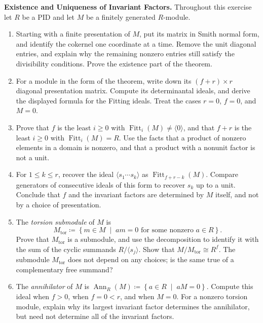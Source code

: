 \documentclass[12pt,reqno]{amsart}
\DeclareMathOperator{\Fitt}{Fitt}
\DeclareMathOperator{\Ann}{Ann}
\begin{document}
\begin{problems}
\item\label{s:structure} \textbf{Existence and Uniqueness of Invariant Factors.} Throughout this exercise let $R$ be a PID and let $M$ be a finitely generated $R$-module.
\begin{enumerate}
\item Starting with a finite presentation of $M$, put its matrix in Smith normal form, and identify the cokernel one coordinate at a time. Remove the unit diagonal entries, and explain why the remaining nonzero entries still satisfy the divisibility conditions. Prove the existence part of the theorem.
\item For a module in the form of the theorem, write down its $(f+r)\times r$ diagonal presentation matrix. Compute its determinantal ideals, and derive the displayed formula for the Fitting ideals. Treat the cases $r=0$, $f=0$, and $M=0$.
\item Prove that $f$ is the least $i\geq0$ with $\Fitt_i(M)\ne\langle0\rangle$, and that $f+r$ is the least $i\geq0$ with $\Fitt_i(M)=R$. Use the facts that a product of nonzero elements in a domain is nonzero, and that a product with a nonunit factor is not a unit.
\item For $1\leq k\leq r$, recover the ideal $\langle s_1\cdots s_k\rangle$ as $\Fitt_{f+r-k}(M)$. Compare generators of consecutive ideals of this form to recover $s_k$ up to a unit. Conclude that $f$ and the invariant factors are determined by $M$ itself, and not by a choice of presentation.
\item The \emph{torsion submodule} of $M$ is
\[
M_{\mathrm{tor}}\coloneqq\left\{m\in M \;\; \big| \;\; am=0\text{ for some nonzero }a\in R\right\}.
\]
Prove that $M_{\mathrm{tor}}$ is a submodule, and use the decomposition to identify it with the sum of the cyclic summands $R/\langle s_j\rangle$. Show that $M/M_{\mathrm{tor}}\cong R^f$. The submodule $M_{\mathrm{tor}}$ does not depend on any choices; is the same true of a complementary free summand?
\item The \emph{annihilator} of $M$ is $\Ann_R(M)\coloneqq\left\{a\in R \;\; \big| \;\; aM=0\right\}$. Compute this ideal when $f>0$, when $f=0<r$, and when $M=0$. For a nonzero torsion module, explain why its largest invariant factor determines the annihilator, but need not determine all of the invariant factors.
\end{enumerate}
\end{problems}

\hrulefill
\end{document}
